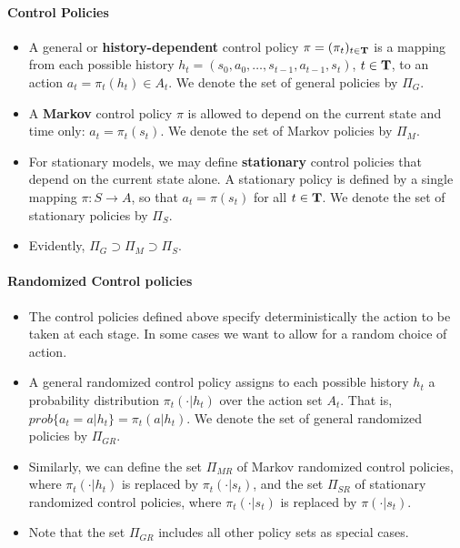 \paragraph{Control Policies}
\begin{itemize}
  \item A general or \textbf{history-dependent} control policy $\pi  = {({\pi _t})_{t \in {\bf{T}}}}$ is a mapping from each possible history ${h_t} = ({s_0},{a_0}, \ldots ,{s_{t - 1}},{a_{t - 1}},{s_t})$, $t \in {\bf{T}}$, to an action ${a_t} = {\pi _t}({h_t}) \in {A_t}$.  We denote the set of general policies by ${\Pi _G}$.
  \item A \textbf{Markov} control policy $\pi $ is allowed to depend on the current state and time only: ${a_t} = {\pi _t}({s_t})$.   We denote the set of Markov policies by ${\Pi _M}$.
  \item For stationary models, we may define \textbf{stationary} control policies that depend on the current state alone. A stationary policy is defined by a single mapping $\pi :S \to A$, so that  ${a_t} = \pi ({s_t})$ for all $t \in {\bf{T}}$. We denote the set of stationary policies by ${\Pi _S}$.
  \item Evidently, ${\Pi _G} \supset {\Pi _M} \supset {\Pi _S}$.
\end{itemize}

\paragraph{Randomized Control policies}
\begin{itemize}
  \item The control policies defined above specify deterministically the action to be taken at each stage. In some cases we want to allow for a random choice of action.
  \item A general randomized control policy assigns to each possible history ${h_t}$ a probability distribution ${\pi _t}( \cdot |{h_t})$ over the action set ${A_t}$. That is,  $prob\{ {a_t} = a|{h_t}\}  = {\pi _t}(a|{h_t})$. We denote the set of general randomized policies by ${\Pi _{GR}}$.
  \item Similarly, we can define the set ${\Pi _{MR}}$ of Markov randomized control policies, where ${\pi _t}( \cdot |{h_t})$ is replaced by ${\pi _t}( \cdot |{s_t})$, and the set ${\Pi _{SR}}$ of stationary randomized control policies, where ${\pi _t}( \cdot |{s_t})$ is replaced by  $\pi ( \cdot |{s_t})$.
  \item Note that the set ${\Pi _{GR}}$ includes all other policy sets as special cases.
\end{itemize}

